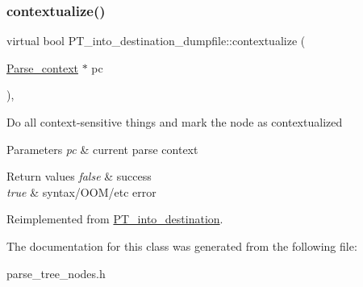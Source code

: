\subsubsection{\texorpdfstring{contextualize()}{contextualize()}}
{\footnotesize\ttfamily virtual bool P\+T\+\_\+into\+\_\+destination\+\_\+dumpfile\+::contextualize (\begin{DoxyParamCaption}\item[{\mbox{\hyperlink{structParse__context}{Parse\+\_\+context}} $\ast$}]{pc }\end{DoxyParamCaption})\hspace{0.3cm}{\ttfamily [inline]}, {\ttfamily [virtual]}}

Do all context-\/sensitive things and mark the node as contextualized


\begin{DoxyParams}{Parameters}
{\em pc} & current parse context\\
\hline
\end{DoxyParams}

\begin{DoxyRetVals}{Return values}
{\em false} & success \\
\hline
{\em true} & syntax/\+O\+O\+M/etc error \\
\hline
\end{DoxyRetVals}


Reimplemented from \mbox{\hyperlink{classPT__into__destination_aa713703e7bae0b070f8a05bcfc0a71a3}{P\+T\+\_\+into\+\_\+destination}}.



The documentation for this class was generated from the following file\+:\begin{DoxyCompactItemize}
\item 
parse\+\_\+tree\+\_\+nodes.\+h\end{DoxyCompactItemize}
